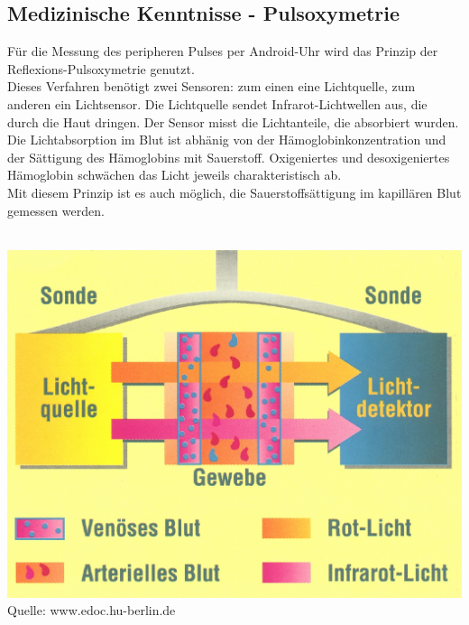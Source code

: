 \subsection{Medizinische Kenntnisse - Pulsoxymetrie} 
Für die Messung des peripheren Pulses per Android-Uhr wird das Prinzip der Reflexions-Pulsoxymetrie genutzt. \\
Dieses Verfahren benötigt zwei Sensoren: zum einen eine Lichtquelle, zum anderen ein Lichtsensor. Die Lichtquelle sendet Infrarot-Lichtwellen aus, die durch die Haut dringen. Der Sensor misst die Lichtanteile, die absorbiert wurden. \\
Die Lichtabsorption im Blut ist abhänig von der Hämoglobinkonzentration und der Sättigung des Hämoglobins mit Sauerstoff. Oxigeniertes und desoxigeniertes Hämoglobin schwächen das Licht jeweils charakteristisch ab. \\
Mit diesem Prinzip ist es auch möglich, die Sauerstoffsättigung im kapillären Blut gemessen werden.\\
\\
\begin{center}
\includegraphics[scale=1.0]{images/pulsoxy.jpg} \\ 
Quelle: www.edoc.hu-berlin.de\\

\end{center}







